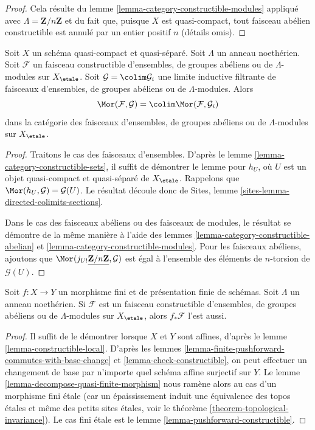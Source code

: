 \begin{proof}
Cela résulte du lemme \ref{lemma-category-constructible-modules}
appliqué avec $\Lambda = \mathbf{Z}/n\mathbf{Z}$
et du fait que, puisque $X$ est quasi-compact, tout faisceau
abélien constructible est annulé par un entier positif $n$ (détails omis).
\end{proof}

\begin{lemma}
\label{lemma-constructible-is-compact}
Soit $X$ un schéma quasi-compact et quasi-séparé. Soit $\Lambda$ un
anneau noethérien. Soit $\mathcal{F}$ un faisceau constructible d'ensembles, de groupes
abéliens ou de $\Lambda$-modules sur $X_\etale$. Soit
$\mathcal{G} = \colim \mathcal{G}_i$ une limite inductive filtrante de faisceaux
d'ensembles, de groupes abéliens ou de $\Lambda$-modules. Alors
$$
\Mor(\mathcal{F}, \mathcal{G}) = \colim \Mor(\mathcal{F}, \mathcal{G}_i)
$$
dans la catégorie des faisceaux d'ensembles, de groupes abéliens ou de $\Lambda$-modules sur
$X_\etale$.
\end{lemma}

\begin{proof}
Traitons le cas des faisceaux d'ensembles. D'après le lemme \ref{lemma-category-constructible-sets},
il suffit de démontrer le lemme pour $h_U$, où $U$ est un objet quasi-compact
et quasi-séparé de $X_\etale$. Rappelons que
$\Mor(h_U, \mathcal{G}) = \mathcal{G}(U)$. Le résultat
découle donc de Sites, lemme \ref{sites-lemma-directed-colimits-sections}.

\medskip\noindent
Dans le cas des faisceaux abéliens ou des faisceaux de modules, le résultat se démontre
de la même manière à l'aide des
lemmes \ref{lemma-category-constructible-abelian} et
\ref{lemma-category-constructible-modules}.
Pour les faisceaux abéliens, ajoutons que
$\Mor(j_{U!}\underline{\mathbf{Z}/n\mathbf{Z}}, \mathcal{G})$
est égal à l'ensemble des éléments de $n$-torsion de $\mathcal{G}(U)$.
\end{proof}

\begin{lemma}
\label{lemma-finite-pushforward-constructible}
Soit $f : X \to Y$ un morphisme fini et de présentation finie de schémas.
Soit $\Lambda$ un anneau noethérien. Si $\mathcal{F}$ est un faisceau constructible
d'ensembles, de groupes abéliens ou de $\Lambda$-modules sur $X_\etale$,
alors $f_*\mathcal{F}$ l'est aussi.
\end{lemma}

\begin{proof}
Il suffit de le démontrer lorsque $X$ et $Y$ sont affines, d'après le
lemme \ref{lemma-constructible-local}.
D'après les
lemmes \ref{lemma-finite-pushforward-commutes-with-base-change} et
\ref{lemma-check-constructible}, on peut effectuer un changement de base par n'importe quel
schéma affine surjectif sur $Y$. Le
lemme \ref{lemma-decompose-quasi-finite-morphism}
nous ramène alors au cas d'un morphisme fini \'etale
(car un épaississement induit une équivalence des topos \'etales
et même des petits sites \'etales, voir le
théorème \ref{theorem-topological-invariance}).
Le cas fini \'etale est le
lemme \ref{lemma-pushforward-constructible}.
\end{proof}

